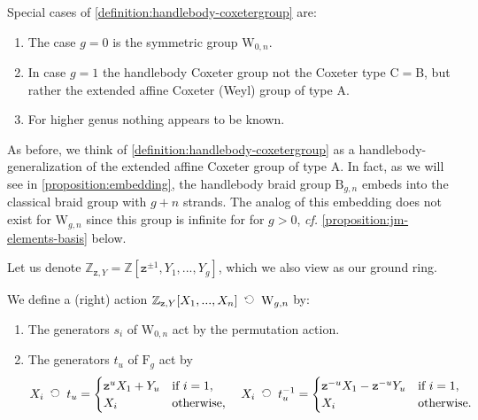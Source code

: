 \documentclass[a4paper,11pt]{amsart}
\newcommand{\cf}{\textsl{cf.}}
\renewcommand{\dots}{\text{...}}
\newcommand{\actsright}{\mathop{\,\;\raisebox{0ex}{\rotatebox{90}{$\circlearrowleft$}}\;\,}}
\newcommand{\setstuff}[1]{\mathrm{#1}}
\newcommand{\Z}{\mathbb{Z}}
\newcommand{\varsym}[1]{\mathtt{#1}}
\newcommand{\zvar}{\varsym{z}}
\newcommand{\Zf}{\Z_{\zvar,Y}}
\numberwithin{equation}{section}
\let\fullref\autoref
\begin{document}
\begin{remark}
Special cases of \fullref{definition:handlebody-coxetergroup} are:
\begin{enumerate}

\setlength\itemsep{0.15cm}

\item The case $g=0$ is the symmetric group $\setstuff{W}_{0,n}$.

\item In case $g=1$ the handlebody Coxeter group not the 
Coxeter type C$=$B, but rather the extended affine Coxeter (Weyl) group of type A.

\item For higher genus nothing appears to be known.

\end{enumerate}
As before, we think of \fullref{definition:handlebody-coxetergroup} as a 
handlebody-generalization of the extended affine Coxeter group of type A. 
In fact, as we will see in \fullref{proposition:embedding}, the handlebody braid 
group $\setstuff{B}_{g,n}$ embeds into the classical braid group with 
$g+n$ strands. The analog of this 
embedding does not exist for $\setstuff{W}_{g,n}$ since 
this group is infinite for 
for $g>0$, {\cf} \fullref{proposition:jm-elements-basis} below.
\end{remark}

Let us denote $\Zf
=\Z[\zvar^{\pm 1},Y_{1},\dots,Y_{g}]$, which we also view as our ground ring.

\begin{definition}\label{definition:action}
We define a (right) action $
\Zf[X_{1},\dots,X_{n}]\actsright\setstuff{W}_{g,n}$
by:
\begin{enumerate}

\setlength\itemsep{0.15cm}

\item The generators $s_{i}$ of $\setstuff{W}_{0,n}$ act by the permutation action.

\item The generators $t_{u}$ of $\setstuff{F}_{g}$ act by
\begin{gather}\label{eq:action}
X_{i}\actsright t_{u}
=
\begin{cases}
\zvar^{u}X_{1}+Y_{u}&\text{if }i=1,
\\
X_{i}&\text{otherwise},
\end{cases}
\quad
X_{i}\actsright t_{u}^{-1}
=
\begin{cases}
\zvar^{-u}X_{1}-\zvar^{-u}Y_{u}&\text{if }i=1,
\\
X_{i}&\text{otherwise}.
\end{cases}
\end{gather}

\end{enumerate}
\end{definition}
\end{document}
